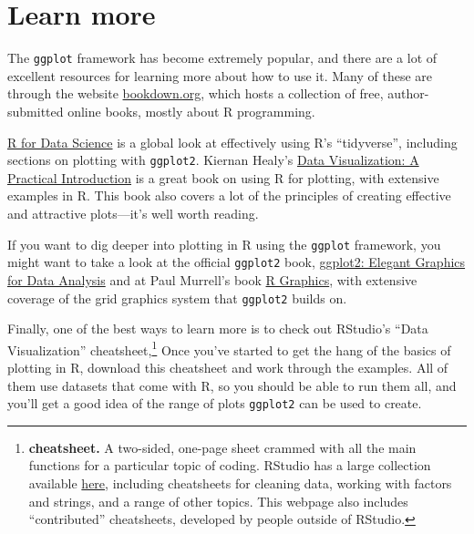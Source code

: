 \documentclass[]{tufte-book}
\begin{document}
\hypertarget{learn-more}{%
\section{Learn more}\label{learn-more}}

The \texttt{ggplot} framework has become extremely popular, and there are a lot of excellent
resources for learning more about how to use it. Many of these are through the website
\href{https://bookdown.org}{bookdown.org}, which hosts a collection of free, author-submitted
online books, mostly about R programming.

\href{https://r4ds.had.co.nz/}{R for Data Science} is a global look at effectively using
R's ``tidyverse'', including sections on plotting with \texttt{ggplot2}.
Kiernan Healy's \href{https://socviz.co/index.html\#preface}{Data Visualization: A Practical Introduction}
is a great book on using R for plotting, with extensive examples in R. This book also covers a lot
of the principles of creating effective and attractive plots---it's well worth reading.

If you want to dig deeper into plotting in R using the \texttt{ggplot} framework, you might want to
take a look at the official \texttt{ggplot2} book,
\href{https://www.amazon.com/ggplot2-Elegant-Graphics-Data-Analysis/dp/0387981403}{ggplot2: Elegant Graphics for Data Analysis} and
at Paul Murrell's book \href{https://www.amazon.com/Graphics-Third-Chapman-Hall-CRC/dp/1498789056/ref=sr_1_1?keywords=paul+murrell+r+graphics\&qid=1553696167\&s=books\&sr=1-1-spell}{R Graphics}, with
extensive coverage of the grid graphics system that \texttt{ggplot2} builds on.

Finally, one of the best ways to learn more is to check out RStudio's ``Data Visualization''
cheatsheet,\footnote{\textbf{cheatsheet.} A two-sided, one-page sheet crammed with all the main functions
  for a particular topic of coding. RStudio has a large collection available
  \href{https://www.rstudio.com/resources/cheatsheets/}{here}, including cheatsheets for cleaning
  data, working with factors and strings, and a range of other topics. This webpage also includes
  ``contributed'' cheatsheets, developed by people outside of RStudio.} Once you've started to
get the hang of the basics of plotting in R, download this cheatsheet and work through the
examples. All of them use datasets that come with R, so you should be able to run them all,
and you'll get a good idea of the range of plots \texttt{ggplot2} can be used to create.
\end{document}
